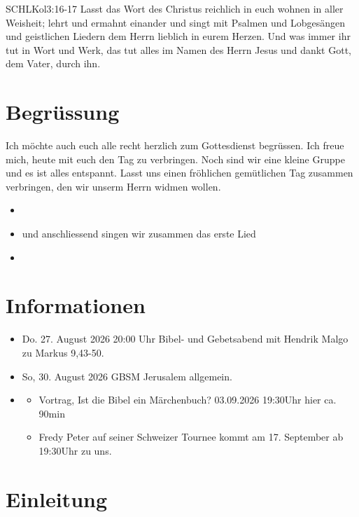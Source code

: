 \documentclass[fontsize=14pt]{mybib}
\author{OTS}
\begin{document}
\begin{bibelbox}{SCHL}{Kol}{3:16-17}
    Lasst das Wort des Christus reichlich in euch wohnen in aller Weisheit; lehrt und ermahnt einander und singt mit Psalmen und Lobgesängen und geistlichen Liedern dem Herrn lieblich in eurem Herzen. Und was immer ihr tut in Wort und Werk, das tut alles im Namen des Herrn Jesus und dankt Gott, dem Vater, durch ihn.
\end{bibelbox}
\section{Begrüssung}
Ich möchte auch euch alle recht herzlich zum Gottesdienst begrüssen. Ich freue mich, heute mit euch den Tag zu verbringen. Noch sind wir eine kleine Gruppe und es ist alles entspannt. Lasst uns einen fröhlichen gemütlichen Tag zusammen verbringen, den wir unserm Herrn widmen wollen.

\begin{itemize}
    \item {}
    \item und anschliessend singen wir zusammen das erste Lied
    \item {}
\end{itemize}

\section{Informationen}
\begin{itemize}    
    \item {} Do. 27. August 2026 20:00 Uhr Bibel- und Gebetsabend mit Hendrik Malgo zu Markus 9,43-50.\\
    \item {} So, 30. August 2026 GBSM Jerusalem allgemein.
    \item {} 
    \begin{itemize}
        \item Vortrag, Ist die Bibel ein Märchenbuch? 03.09.2026 19:30Uhr hier ca. 90min
        \item Fredy Peter auf seiner Schweizer Tournee kommt am 17. September ab 19:30Uhr zu uns.
    \end{itemize}    
\end{itemize}
\section{Einleitung}
\end{document}
